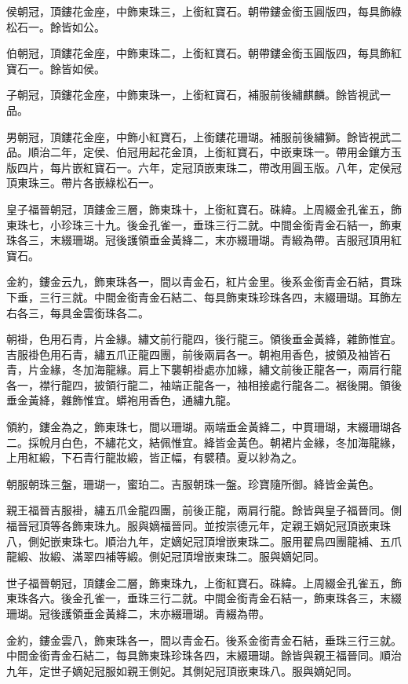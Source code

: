 \begin{pinyinscope}
侯朝冠，頂鏤花金座，中飾東珠三，上銜紅寶石。朝帶鏤金銜玉圓版四，每具飾綠松石一。餘皆如公。

伯朝冠，頂鏤花金座，中飾東珠二，上銜紅寶石。朝帶鏤金銜玉圓版四，每具飾紅寶石一。餘皆如侯。

子朝冠，頂鏤花金座，中飾東珠一，上銜紅寶石，補服前後繡麒麟。餘皆視武一品。

男朝冠，頂鏤花金座，中飾小紅寶石，上銜鏤花珊瑚。補服前後繡獅。餘皆視武二品。順治二年，定侯、伯冠用起花金頂，上銜紅寶石，中嵌東珠一。帶用金鑲方玉版四片，每片嵌紅寶石一。六年，定冠頂嵌東珠二，帶改用圓玉版。八年，定侯冠頂東珠三。帶片各嵌綠松石一。

皇子福晉朝冠，頂鏤金三層，飾東珠十，上銜紅寶石。硃緯。上周綴金孔雀五，飾東珠七，小珍珠三十九。後金孔雀一，垂珠三行二就。中間金銜青金石結一，飾東珠各三，末綴珊瑚。冠後護領垂金黃絳二，末亦綴珊瑚。青緞為帶。吉服冠頂用紅寶石。

金約，鏤金云九，飾東珠各一，間以青金石，紅片金里。後系金銜青金石結，貫珠下垂，三行三就。中間金銜青金石結二、每具飾東珠珍珠各四，末綴珊瑚。耳飾左右各三，每具金雲銜珠各二。

朝褂，色用石青，片金緣。繡文前行龍四，後行龍三。領後垂金黃絳，雜飾惟宜。吉服褂色用石青，繡五爪正龍四團，前後兩肩各一。朝袍用香色，披領及袖皆石青，片金緣，冬加海龍緣。肩上下襲朝褂處亦加緣，繡文前後正龍各一，兩肩行龍各一，襟行龍四，披領行龍二，袖端正龍各一，袖相接處行龍各二。裾後開。領後垂金黃絳，雜飾惟宜。蟒袍用香色，通繡九龍。

領約，鏤金為之，飾東珠七，間以珊瑚。兩端垂金黃絳二，中貫珊瑚，末綴珊瑚各二。採帨月白色，不繡花文，結佩惟宜。絳皆金黃色。朝裙片金緣，冬加海龍緣，上用紅緞，下石青行龍妝緞，皆正幅，有襞積。夏以紗為之。

朝服朝珠三盤，珊瑚一，蜜珀二。吉服朝珠一盤。珍寶隨所御。絳皆金黃色。

親王福晉吉服褂，繡五爪金龍四團，前後正龍，兩肩行龍。餘皆與皇子福晉同。側福晉冠頂等各飾東珠九。服與嫡福晉同。並按崇德元年，定親王嫡妃冠頂嵌東珠八，側妃嵌東珠七。順治九年，定嫡妃冠頂增嵌東珠二。服用翟鳥四團龍補、五爪龍緞、妝緞、滿翠四補等緞。側妃冠頂增嵌東珠二。服與嫡妃同。

世子福晉朝冠，頂鏤金二層，飾東珠九，上銜紅寶石。硃緯。上周綴金孔雀五，飾東珠各六。後金孔雀一，垂珠三行二就。中間金銜青金石結一，飾東珠各三，末綴珊瑚。冠後護領垂金黃絳二，末亦綴珊瑚。青綴為帶。

金約，鏤金雲八，飾東珠各一，間以青金石。後系金銜青金石結，垂珠三行三就。中間金銜青金石結二，每具飾東珠珍珠各四，末綴珊瑚。餘皆與親王福晉同。順治九年，定世子嫡妃冠服如親王側妃。其側妃冠頂嵌東珠八。服與嫡妃同。


\end{pinyinscope}
